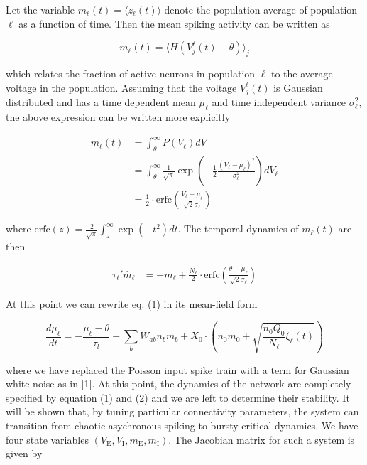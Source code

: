 \documentclass{article} %
\begin{document}
Let the variable $m_{\ell}(t) = \langle z_{\ell}(t) \rangle$ denote the population average of population $\ell$ as a function of time. Then the mean spiking activity can be written as

\begin{equation*}
m_{\ell}(t) = \langle H(V_{j}^{\ell}(t) - \theta)\rangle_{j}
\end{equation*}

which relates the fraction of active neurons in population $\ell$ to the average voltage in the population. Assuming that the voltage $V_{j}^{\ell}(t)$ is Gaussian distributed and has a time dependent mean $\mu_{\ell}$ and time independent variance $\sigma_{\ell}^{2}$, the above expression can be written more explicitly

\begin{align*}
m_{\ell}(t) &= \int_{\theta}^{\infty} P(V_{\ell})dV\\
&= \int_{\theta}^{\infty} \frac{1}{\sqrt{\pi}}\exp\left(-\frac{1}{2}\frac{\left(V_{\ell}-\mu_{\ell}\right)^{2}}{\sigma_{\ell}^{2}}\right)dV_{\ell}\\
&= \frac{1}{2}\cdot \mathrm{erfc}\left(\frac{V_{\ell}-\mu_{\ell}}{\sqrt{2}\sigma_{\ell}}\right)
\end{align*}


where $\mathrm{erfc}(z) = \frac{2}{\sqrt{\pi}}\int_{z}^{\infty} \exp\left(-t^{2}\right)dt$. The temporal dynamics of $m_{\ell}(t)$ are then

\begin{align}
\tau_{\ell}'\dot{m_{\ell}} &= -m_{\ell} + \frac{N_{\ell}}{2}\cdot \mathrm{erfc}\left(\frac{\theta-\mu_{\ell}}{\sqrt{2}\sigma_{\ell}}\right)
\end{align}

At this point we can rewrite eq. (1) in its mean-field form

\begin{equation}
\frac{d\mu_{\ell}}{dt} = -\frac{\mu_{\ell}-\theta}{\tau_{l}} + \sum_{b} W_{ab}n_{b}m_{b} + X_{0}\cdot\left(n_{0}m_{0} + \sqrt{\frac{n_{0}Q_{0}}{N_{\ell}}\xi_{\ell}(t)}\right)
\end{equation}

where we have replaced the Poisson input spike train with a term for Gaussian white noise as in [1]. At this point, the dynamics of the network are completely specified by equation (1) and (2) and we are left to determine their stability. It will be shown that, by tuning particular connectivity parameters, the system can transition from chaotic asychronous spiking to bursty critical dynamics. We have four state variables $\left(V_{\mathrm{E}}, V_{\mathrm{I}}, m_{\mathrm{E}}, m_{\mathrm{I}}\right)$. The Jacobian matrix for such a system is given by 
\end{document}
